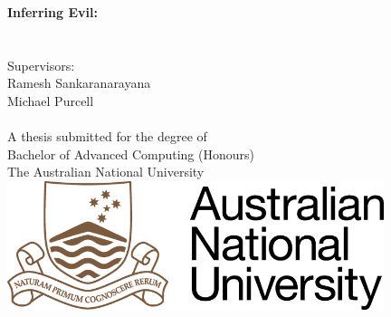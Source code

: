 \begin{titlepage}
  \enlargethispage{2cm}
  \begin{center}
    \makeatletter
    \Huge\textbf{Inferring Evil:}\\\Huge{\@title}\\[2.5cm]
    \huge{\@author} \\[1cm]
    \Large{Supervisors:\\
    Ramesh Sankaranarayana\\
    Michael Purcell}\\[2.5cm]
    \makeatother
    \thismonth\\[2cm]
    \large{A thesis submitted for the degree of \\
    Bachelor of Advanced Computing (Honours) \\
    The Australian National University} \\[2cm]
    \includegraphics[width=11cm]{figs/title/cropped-Australian-National-University-Logo.png}
  \end{center}
\end{titlepage}
